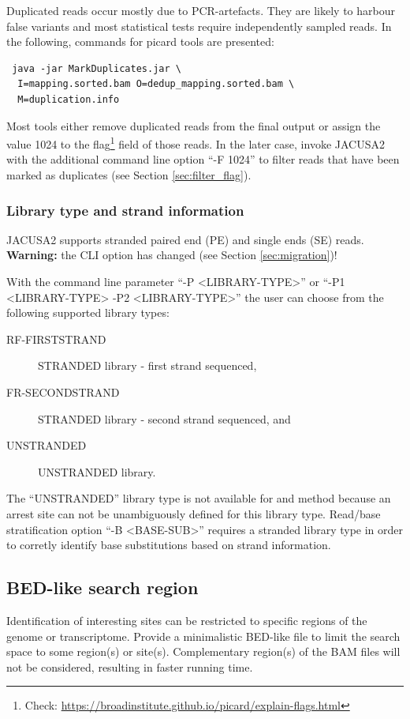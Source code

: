 \documentclass[10pt,a4paper,final]{article}
\begin{document}
Duplicated reads occur mostly due to PCR-artefacts. They are likely to harbour false variants and
most statistical tests require independently sampled reads. In the following, commands for picard 
tools are presented:
\begin{verbatim} java -jar MarkDuplicates.jar \
  I=mapping.sorted.bam O=dedup_mapping.sorted.bam \
  M=duplication.info
\end{verbatim}
Most tools either remove duplicated reads from the final output or assign the value 1024 to the flag\footnote{
Check: \url{https://broadinstitute.github.io/picard/explain-flags.html}} field of those reads. In the
later case, invoke JACUSA2 with the additional command line option ``-F 1024'' to filter reads that
have been marked as duplicates (see Section \ref{sec:filter_flag}).
\subsubsection{Library type and strand information}\label{sec:library_type}
JACUSA2 supports stranded paired end (PE) and single ends (SE) reads. \textbf{Warning:} the CLI option
has changed (see Section \ref{sec:migration})!

With the command line parameter ``-P <LIBRARY-TYPE>'' or ``-P1 <LIBRARY-TYPE> -P2 <LIBRARY-TYPE>''
the user can choose from the following supported library types:
\begin{description} 
\item[RF-FIRSTSTRAND] STRANDED library - first strand sequenced,
\item[FR-SECONDSTRAND] STRANDED library - second strand sequenced, and
\item[UNSTRANDED] UNSTRANDED library.
\end{description}
The ``UNSTRANDED'' library type is not available for \rtarrest and \lrtarrest method because an arrest 
site can not be unambiguously defined for this library type. Read/base stratification option 
``-B <BASE-SUB>'' requires a stranded library type in order to corretly identify base substitutions 
based on strand information.
\subsection{BED-like search region}
Identification of interesting sites can be restricted to specific regions of the genome or transcriptome.
Provide a minimalistic BED-like file to limit the search space to some region(s) or site(s). 
Complementary region(s) of the BAM files will not be considered, resulting in faster running time.
\end{document}
